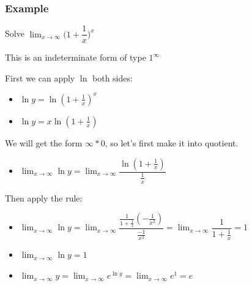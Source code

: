 \documentclass[t]{beamer}
\theoremstyle{plain}
\theoremstyle{definition}
\newcommand{\limm}[1]{\displaystyle \lim_{x\to #1}}
\begin{document}
\begin{frame}

\frametitle{Example}

\footnotesize

Solve $\limm{\infty}\big(1 + \dfrac{1}{x}\big)^x$

This is an indeterminate form of type $1^{\infty}$  \pause

\medskip

First we can apply $\ln$ both sides:

\begin{itemize}
	\item $\ln{y} = \ln(1 + \frac{1}{x})^x$
	\item $\ln{y} = x \ln(1 + \frac{1}{x})$
\end{itemize}

We will get the form $\infty * 0$, so let's first make it into quotient.

\begin{itemize}
	\item $ \limm{\infty} \ln y = \limm{\infty} \dfrac{\ln(1 + \frac{1}{x})}{\frac{1}{x}}$
\end{itemize}

Then apply the rule:

\begin{itemize}
	\item $ \limm{\infty} \ln y = \limm{\infty} \dfrac{\frac{1}{1+\frac{1}{x}}(-\frac{1}{x^2})}{\frac{-1}{x^2}} = \limm{\infty} \dfrac{1}{1+ \frac{1}{x}} = 1$ 
	\item $ \limm{\infty} \ln{y} = 1$
	\item $ \limm{\infty} y = \limm{\infty}e^{\ln y} = \limm{\infty}e^{1} = e$
\end{itemize}

\end{frame}
\end{document}
